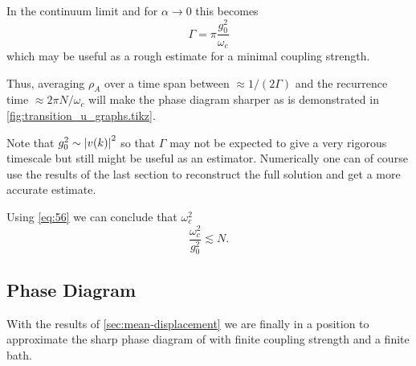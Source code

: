 \documentclass[fontsize=10pt,paper=b5,open=any,
twoside=no,toc=listof,toc=bibliography,headings=optiontohead,
captions=nooneline,captions=tableabove,english,DIV=15,numbers=noenddot,final,parskip=half-,
headinclude=true,footinclude=false,BCOR=0mm]{scrartcl}
\begin{document}
In the continuum limit and for \(α\to 0\) this becomes
\begin{equation}
  \label{eq:56}
  Γ = π \frac{g_{0}^{2}}{ω_{c}}
\end{equation}
which may be useful as a rough estimate for a minimal coupling strength.

Thus, averaging \(ρ_{A}\) over a time span between \(\approx 1/(2Γ)\)
and the recurrence time \(\approx 2π N / ω_{c}\) will make the phase
diagram sharper as is demonstrated in
\cref{fig:transition_u_graphs.tikz}.

Note that \(g_{0}^{2}\sim \abs{v(k)}^{2}\) so that \(Γ\) may not be
expected to give a very rigorous timescale but still might be useful
as an estimator. Numerically one can of course use the results of the
last section to reconstruct the full solution and get a more accurate
estimate.

Using \cref{eq:56} we can conclude that \(ω_{c}^{2}\)
\begin{equation}
  \label{eq:57}
  \frac{ω_{c}^{2}}{g_{0}^{2}} \lesssim N.
\end{equation}

\subsection{Phase Diagram}
\label{sec:phase-diagram}

With the results of \cref{sec:mean-displacement} we are finally in a
position to approximate the sharp phase diagram of
\cite{Ricottone2020} with finite coupling strength and a finite bath.
\end{document}
